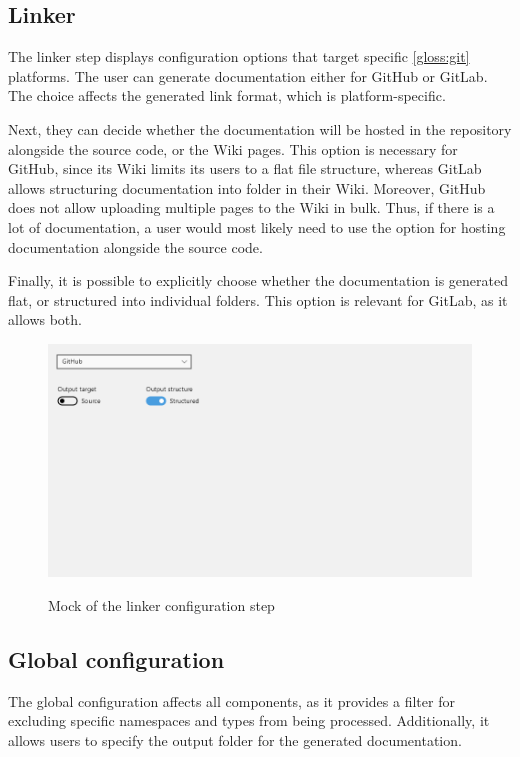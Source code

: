 \pagebreak
\subsection{Linker}

The linker step displays configuration options that target specific \ref{gloss:git} platforms. The user can generate documentation either for GitHub or GitLab. The choice affects the generated link format, which is platform-specific.

Next, they can decide whether the documentation will be hosted in the repository alongside the source code, or the Wiki pages. This option is necessary for GitHub, since its Wiki limits its users to a flat file structure, whereas GitLab allows structuring documentation into folder in their Wiki. Moreover, GitHub does not allow uploading multiple pages to the Wiki in bulk. Thus, if there is a lot of documentation, a user would most likely need to use the option for hosting documentation alongside the source code.

Finally, it is possible to explicitly choose whether the documentation is generated flat, or structured into individual folders. This option is relevant for GitLab, as it allows both.

\begin{figure}[H]
    \includegraphics[width=\linewidth]{img/mockLink provider.png}
    \label{fig:pluginLinker}
    \caption{Mock of the linker configuration step}
\end{figure}

\pagebreak
\subsection{Global configuration}

The global configuration affects all components, as it provides a filter for excluding specific namespaces and types from being processed. Additionally, it allows users to specify the output folder for the generated documentation.

